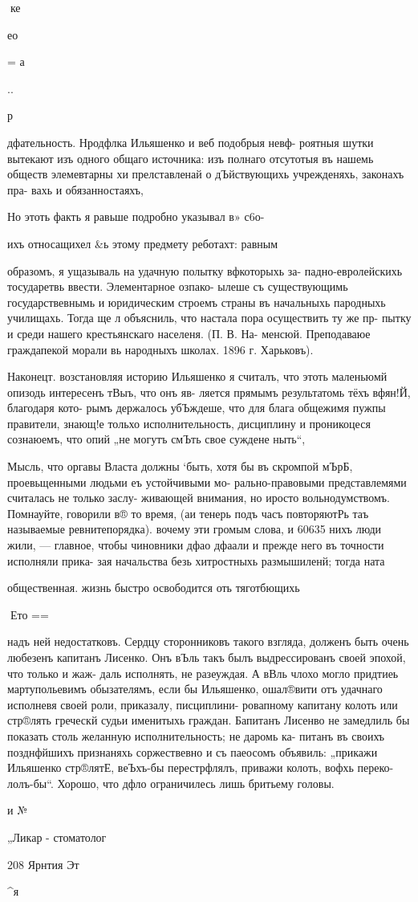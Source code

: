 ке

ео

=
а

..

р

дфательность. Нродфлка Ильяшенко и веб подобрыя невф-
роятныя шутки вытекают изъ одного общаго источника:
изъ полнаго отсутотыя въ нашемь обществ элемевтарны хи
прелставленай о дЪйствующихь учрежденяхь, законахъ пра-
вахь и обязанностаяхъ,

Но этоть факть я равьше подробно указывал в» с6о-

ихъ относащихел &ь этому предмету реботахт: равным

образомъ, я ущазываль на удачную полытку вфкоторыхь за-
падно-евролейскихь тосударетвь ввести. Элементарное озпако-
ылеше съ существующимь государствевнымь и юридическим
строемъ страны въ начальныхь пародныхь училищахь. Тогда
ще л объясниль, что настала пора осуществить ту же пр-
пытку и среди нашего крестьянскаго населеня. (П. В. На-
менсюй. Преподаваюе граждапекой морали вь народныхъ
школах. 1896 г. Харьковъ).

Наконецт. возстановляя историю Ильяшенко я считалъ,
что этоть маленьюмй опизодь интересенъ тВыъ, что онъ яв-
ляется прямымъ результатомь тёхъ вфян!Й, благодаря кото-
рымъ держалось убЪждеше, что для блага общежимя пужпы
правители, знающ!е тольхо исполнительность, дисциплину и
проникоцеся сознаюемъ, что опий „не могутъ смЪть свое
суждене ныть“,

Мысль, что оргавы Власта должны ‘быть, хотя бы въ
скромпой мЪрБ, проевьщенными людьми еъ устойчивыми мо-
рально-правовыми представлемями считалась не только заслу-
живающей внимания, но иросто вольнодумствомъ. Помнауйте,
говорили в® то время, (аи тенерь подъ часъ повторяютРь
таъ называемые ревните\н порядка). вочему эти громым
слова, и 60635 нихъ люди жили, — главное, чтобы чиновники
дфао дфаали и прежде него въ точности исполняли прика-
зая начальства безь хитростныхь размышиленй; тогда ната

общественная. жизнь быстро освободится оть тяготбющихь

Ето ==

надъ ней недостатковъ. Сердцу сторонниковъ такого взгляда,
долженъ быть очень любезенъ капитанъ Лисенко. Онъ вЪль
такъ былъ выдрессированъ своей эпохой, что только и жаж-
даль исполнять, не разеуждая. А вВль члохо могло придтиеь
мартупольевимъ обызателямъ, если бы Ильяшенко, ошал®вити
отъ удачнаго исполневя своей роли, приказалу, писциплини-
ровапному капитану колоть или стр®лять греческй судьи
именитыхь граждан. Бапитанъ Лисенво не замедлиль бы
показать столь желанную исполнительность; не даромь ка-
питанъ въ своихъ позднфйшихъ признаняхь соржествевно
и съ паеосомъ объявиль: „прикажи Ильяшенко стр®лятЕ,
веЪхъ-бы перестрфлялъ, приважи колоть, вофхь переко-
лолъ-бы“. Хорошо, что дфло ограничилесь лишь бритьему
головы.

и №

„Ликар - стоматолог

208
Ярнтия Эт

^я
